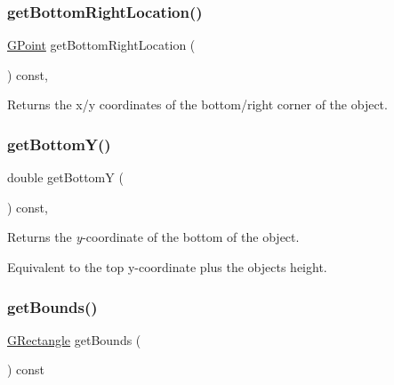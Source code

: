 \subsubsection{\texorpdfstring{get\+Bottom\+Right\+Location()}{getBottomRightLocation()}}
{\footnotesize\ttfamily \mbox{\hyperlink{classGPoint}{G\+Point}} get\+Bottom\+Right\+Location (\begin{DoxyParamCaption}{ }\end{DoxyParamCaption}) const\hspace{0.3cm}{\ttfamily [virtual]}, {\ttfamily [inherited]}}



Returns the x/y coordinates of the bottom/right corner of the object. 

\mbox{\label{classGObject_a4316a2406c18e1c6d061fe51fd355490}} 
\subsubsection{\texorpdfstring{get\+Bottom\+Y()}{getBottomY()}}
{\footnotesize\ttfamily double get\+BottomY (\begin{DoxyParamCaption}{ }\end{DoxyParamCaption}) const\hspace{0.3cm}{\ttfamily [virtual]}, {\ttfamily [inherited]}}



Returns the {\itshape y}-\/coordinate of the bottom of the object. 

Equivalent to the top y-\/coordinate plus the object\textquotesingle{}s height. \mbox{\label{classGCompound_a2f46ec8a3b533c690b3b3e56d4f34afe}} 
\subsubsection{\texorpdfstring{get\+Bounds()}{getBounds()}}
{\footnotesize\ttfamily \mbox{\hyperlink{classGRectangle}{G\+Rectangle}} get\+Bounds (\begin{DoxyParamCaption}{ }\end{DoxyParamCaption}) const\hspace{0.3cm}{\ttfamily [virtual]}}



